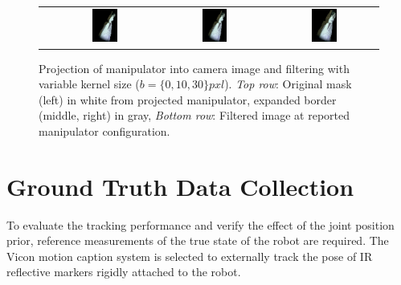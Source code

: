 \begin{figure}
\begin{tabular}{cc:c:c}
 & \includegraphics[width=0.25\textwidth]{images/filtering/rgb0.png} & \includegraphics[width=0.25\textwidth]{images/filtering/rgb10.png} & \includegraphics[width=0.25\textwidth]{images/filtering/rgb30.png} \\
\end{tabular}
\caption[Observation filtering]{Projection of manipulator into camera image and filtering with variable kernel size ($b=\{0,10,30\} \si{pxl}$). \textit{Top row}: Original mask (left) in white from projected manipulator, expanded border (middle, right) in gray, \textit{Bottom row}: Filtered image at reported manipulator configuration.}
\label{fig:filtered_perception}
\end{figure}

\section{Ground Truth Data Collection}

To evaluate the tracking performance and verify the effect of the joint position prior, reference measurements of the true state of the robot are required. The Vicon motion caption system is selected to externally track the pose of IR reflective markers rigidly attached to the robot.

